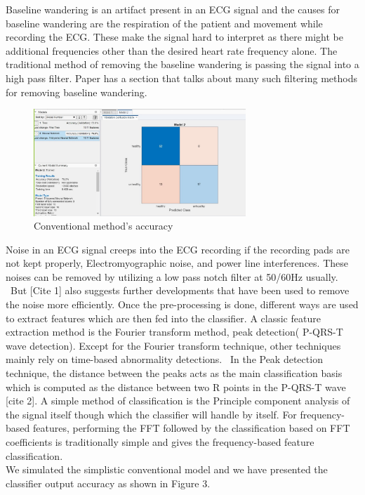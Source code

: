 \documentclass[10pt,twocolumn,letterpaper]{article}
\begin{document}
Baseline wandering is an artifact present in an ECG signal and the causes for baseline wandering are the respiration of the patient and movement while recording the ECG. These make the signal hard to interpret as there might be additional frequencies other than the desired heart rate frequency alone. The traditional method of removing the baseline wandering is passing the signal into a high pass filter\cite{Alpher05}. Paper has a section that talks about many such filtering methods for removing baseline wandering.\\
\begin{figure}[htbp]
\includegraphics[width=8cm]{ConventionalResult.jpg}
\caption{Conventional method's accuracy}
\label{Classification using conventional approach}
\end{figure}
Noise in an ECG signal creeps into the ECG recording if the recording pads are not kept properly, Electromyographic noise, and power line interferences. These noises can be removed by utilizing a low pass notch filter at 50/60Hz usually.  But [Cite 1] also suggests further developments that have been used to remove the noise more efficiently.
Once the pre-processing is done, different ways are used to extract features which are then fed into the classifier. A classic feature extraction method is the Fourier transform method, peak detection( P-QRS-T wave detection). Except for the Fourier transform technique, other techniques mainly rely on time-based abnormality detections.  In the Peak detection technique, the distance between the peaks acts as the main classification basis which is computed as the distance between two R points in the P-QRS-T wave [cite 2]. A simple method of classification is the Principle component analysis of the signal itself though which the classifier will handle by itself. For frequency-based features, performing the FFT followed by the classification based on FFT coefficients is traditionally simple and gives the frequency-based feature classification.\\
We simulated the simplistic conventional model and we have presented the classifier output accuracy as shown in Figure 3.
\end{document}
